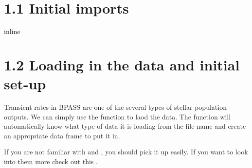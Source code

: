 \documentclass[letterpaper,10pt,english]{sphinxmanual}
\begin{document}
\section{1.1 Initial imports}
\label{\detokenize{Transient_rates:1.1-Initial-imports}}
{
%
\begin{sphinxVerbatim}[commandchars=\\\{\}]
\llap{\color{nbsphinxin}[1]:\,\hspace{\fboxrule}\hspace{\fboxsep}}   
   
   


 inline
\end{sphinxVerbatim}
}


\section{1.2 Loading in the data and initial set-up}
\label{\detokenize{Transient_rates:1.2-Loading-in-the-data-and-initial-set-up}}
Transient rates in BPASS are one of the several types of stellar population outputs. We can simply use the  function to laod the data. The function will automatically know what type of data it is loading from the file name and create an appropriate data frame to put it in.

If you are not familiar with  and , you should pick it up easily. If you want to look into them more check out this .
\end{document}

